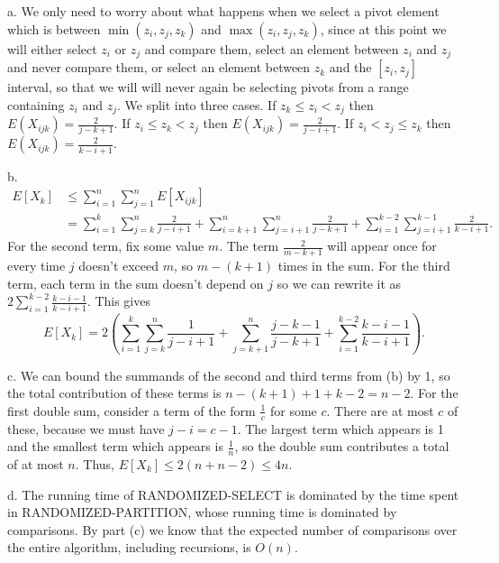 \documentclass{article}
\begin{document}
a.  We only need to worry about what happens when we select a pivot element which is between $\min(z_i,z_j,z_k)$ and $\max(z_i,z_j,z_k)$, since at this point we will either select $z_i$ or $z_j$ and compare them, select an element between $z_i$ and $z_j$ and never compare them, or select an element between $z_k$ and the $[z_i,z_j]$ interval, so that we will will never again be selecting pivots from a range containing $z_i$ and $z_j$.  We split into three cases.  If $z_k \leq z_i < z_j$ then $E(X_{ijk})=  \frac{2}{j-k+1} $.  If $z_i \leq z_k < z_j$ then $E(X_{ijk})=  \frac{2}{j-i+1}$.  If $z_i < z_j \leq z_k$ then $E(X_{ijk})=  \frac{2}{k-i+1}$. 

b. 
\begin{align*}
E[X_k] &\leq \sum_{i=1}^n \sum_{j=1}^n E[X_{ijk}] \\
&= \sum_{i=1}^k \sum_{j=k}^n \frac{2}{j-i+1} + \sum_{i=k+1}^n \sum_{j=i+1}^n \frac{2}{j-k+1} + \sum_{i=1}^{k-2}\sum_{j=i+1}^{k-1}\frac{2}{k-i+1}.
\end{align*}
For the second term, fix some value $m$.  The term $\frac{2}{m-k+1}$ will appear once for every time $j$ doesn't exceed $m$, so $m- (k+1)$ times in the sum.  For the third term, each term in the sum doesn't depend on $j$ so we can rewrite it as $2\sum_{i=1}^{k-2} \frac{k-i-1}{k-i+1}$.  This gives
\[ E[X_k] = 2\left(\sum_{i=1}^k \sum_{j=k}^n \frac{1}{j-i+1} + \sum_{j=k+1}^n \frac{j-k-1}{j-k+1} + \sum_{i=1}^{k-2} \frac{k-i-1}{k-i+1} \right).\]

c.  We can bound the summands of the second and third terms from (b) by 1, so the total contribution of these terms is $n-(k+1)+1 + k-2 = n-2$.  For the first double sum, consider a term of the form $\frac{1}{c}$ for some $c$.  There are at most $c$ of these, because we must have $j-i = c-1$.  The largest term which appears is 1 and the smallest term which appears is $\frac{1}{n}$, so the double sum contributes a total of at most $n$.  Thus, $E[X_k] \leq 2(n + n - 2) \leq 4n$.


d. The running time of RANDOMIZED-SELECT is dominated by the time spent in RANDOMIZED-PARTITION, whose running time is dominated by comparisons.  By part (c) we know that the expected number of comparisons over the entire algorithm, including recursions, is $O(n)$.
\end{document}
